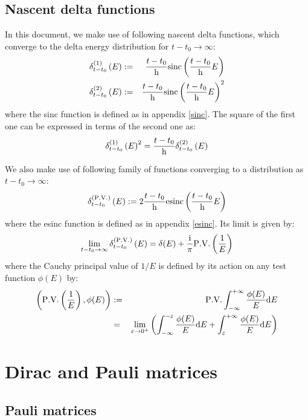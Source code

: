 \documentclass[10pt,a4paper,twoside,openany]{book}
\begin{document}
\section{Nascent delta functions}
\label{delta}

In this document, we make use of following nascent delta functions, which converge to the delta energy distribution for $t - t_0 \to \infty$:
\begin{eqnarray*}
\delta^{({1})}_{t - t_0} \left({E}\right) & := & \frac{t - t_0} {\mathrm h} \mathrm{sinc} \left( {\frac{t - t_0} {\mathrm h} E} \right) \\
\delta^{({2})}_{t - t_0} \left({E}\right) & := & \frac{t - t_0} {\mathrm h} \mathrm{sinc} \left( {\frac{t - t_0} {\mathrm h} E} \right)^2
\end{eqnarray*}
where the sinc function is defined as in appendix \ref{sinc}. The square of the first one can be expressed in terms of the second one as:
\begin{equation*}
\delta^{({1})}_{t - t_0} \left({E}\right)^2 = \frac{t - t_0} {\mathrm h} \delta^{({2})}_{t - t_0} \left({E}\right)
\end{equation*}

We also make use of following family of functions converging to a distribution as $t - t_0 \to \infty$:
\begin{equation*}
\delta^{({\mathrm{P.V.}})}_{t - t_0} \left({E}\right) := 2 \frac{t - t_0} {\mathrm h} \mathrm{esinc} \left( {\frac{t - t_0} {\mathrm h} E} \right)
\end{equation*}
where the esinc function is defined as in appendix \ref{esinc}. Its limit is given by:
\begin{equation*}
\lim_{t - t_0 \to \infty} \delta^{({\mathrm{P.V.}})}_{t - t_0} \left({E}\right) = \delta(E) + \frac {\mathrm{i}} \pi \mathrm{P.V.} \left( \frac 1 E \right)
\end{equation*}
where the Cauchy principal value of $1/E$ is defined by its action on any test function $\phi(E)$ by:
\begin{eqnarray*}
\left( \mathrm{P.V.} \left( \frac 1 E \right), \phi(E) \right) & := & \mathrm{P.V.} \int_{-\infty}^{+\infty} \frac{\phi(E)}E \mathrm dE \\
& = & \lim_{\varepsilon \to 0^+} \left( \int_{-\infty}^{-\varepsilon} \frac{\phi(E)}E \mathrm dE + \int_{\varepsilon}^{+\infty} \frac{\phi(E)}E \mathrm dE \right)
\end{eqnarray*}

\chapter{Dirac and Pauli matrices}

\section{Pauli matrices}
\end{document}
